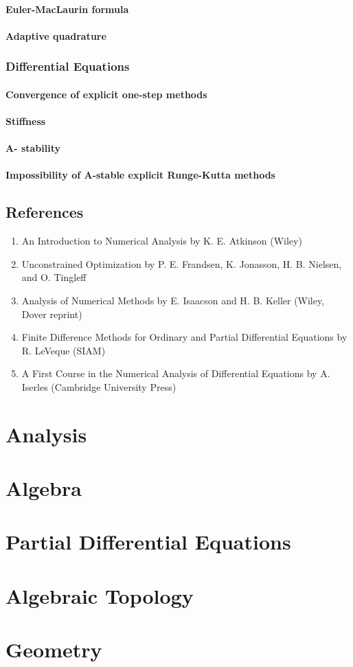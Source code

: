 \documentclass[a4paper,12pt]{article} %
\begin{document}
\paragraph{Euler-MacLaurin formula}
\paragraph{Adaptive quadrature}

\subsubsection{Differential Equations}
\paragraph{Convergence of explicit one-step methods}
\paragraph{Stiffness}
\paragraph{A- stability}
\paragraph{Impossibility of A-stable explicit Runge-Kutta methods}

\subsection{References}
\begin{enumerate}
	\item An Introduction to Numerical Analysis by K. E. Atkinson (Wiley)
	\item Unconstrained Optimization by P. E. Frandsen, K. Jonasson, H. B. Nielsen, and O. Tingleff
	\item Analysis of Numerical Methods by E. Isaacson and H. B. Keller (Wiley, Dover reprint)
	\item Finite Difference Methods for Ordinary and Partial Differential Equations by R. LeVeque (SIAM)
	\item A First Course in the Numerical Analysis of Differential Equations by A. Iserles (Cambridge University Press)
\end{enumerate}

\section{Analysis}

\section{Algebra}

\section{Partial Differential Equations}

\section{Algebraic Topology}

\section{Geometry}
\end{document}
